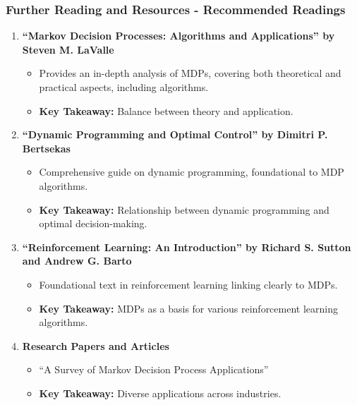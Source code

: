 \documentclass[aspectratio=169]{beamer}
\begin{document}
\begin{frame}[fragile]
    \frametitle{Further Reading and Resources - Recommended Readings}
    
    \begin{enumerate}
        \item \textbf{“Markov Decision Processes: Algorithms and Applications” by Steven M. LaValle}
        \begin{itemize}
            \item Provides an in-depth analysis of MDPs, covering both theoretical and practical aspects, including algorithms.
            \item \textbf{Key Takeaway:} Balance between theory and application.
        \end{itemize}
        
        \item \textbf{“Dynamic Programming and Optimal Control” by Dimitri P. Bertsekas}
        \begin{itemize}
            \item Comprehensive guide on dynamic programming, foundational to MDP algorithms.
            \item \textbf{Key Takeaway:} Relationship between dynamic programming and optimal decision-making.
        \end{itemize}
        
        \item \textbf{“Reinforcement Learning: An Introduction” by Richard S. Sutton and Andrew G. Barto}
        \begin{itemize}
            \item Foundational text in reinforcement learning linking clearly to MDPs.
            \item \textbf{Key Takeaway:} MDPs as a basis for various reinforcement learning algorithms.
        \end{itemize}
        
        \item \textbf{Research Papers and Articles}
        \begin{itemize}
            \item “A Survey of Markov Decision Process Applications” 
            \item \textbf{Key Takeaway:} Diverse applications across industries.
        \end{itemize}
    \end{enumerate}
\end{frame}
\end{document}
